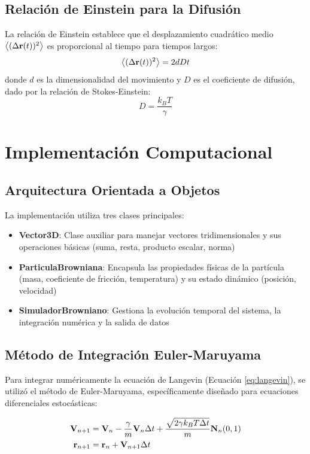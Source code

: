 \documentclass[11pt,a4paper]{article}
\begin{document}
\subsection{Relación de Einstein para la Difusión}
La relación de Einstein establece que el desplazamiento cuadrático medio $\expval{(\Delta\vb{r}(t))^2}$ es proporcional al tiempo para tiempos largos:
\begin{equation}
    \expval{(\Delta\vb{r}(t))^2} = 2dDt
    \label{eq:difusion_einstein}
\end{equation}
donde $d$ es la dimensionalidad del movimiento y $D$ es el coeficiente de difusión, dado por la relación de Stokes-Einstein:
\begin{equation}
    D = \frac{k_B T}{\gamma}
    \label{eq:stokes_einstein}
\end{equation}

\section{Implementación Computacional}

\subsection{Arquitectura Orientada a Objetos}
La implementación utiliza tres clases principales:

\begin{itemize}
    \item \textbf{Vector3D}: Clase auxiliar para manejar vectores tridimensionales y sus operaciones básicas (suma, resta, producto escalar, norma)
    \item \textbf{ParticulaBrowniana}: Encapsula las propiedades físicas de la partícula (masa, coeficiente de fricción, temperatura) y su estado dinámico (posición, velocidad)
    \item \textbf{SimuladorBrowniano}: Gestiona la evolución temporal del sistema, la integración numérica y la salida de datos
\end{itemize}

\subsection{Método de Integración Euler-Maruyama}
Para integrar numéricamente la ecuación de Langevin (Ecuación \ref{eq:langevin}), se utilizó el método de Euler-Maruyama, específicamente diseñado para ecuaciones diferenciales estocásticas:

\begin{align}
    \vb{V}_{n+1} &= \vb{V}_n - \frac{\gamma}{m}\vb{V}_n \Delta t + \frac{\sqrt{2\gamma k_B T \Delta t}}{m} \vb{N}_n(0,1) \\
    \vb{r}_{n+1} &= \vb{r}_n + \vb{V}_{n+1} \Delta t
\end{align}
\end{document}

